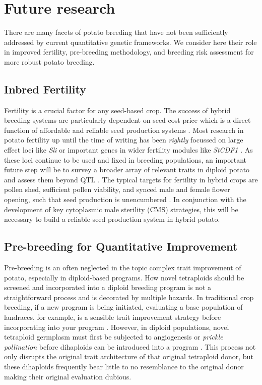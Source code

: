 \documentclass[
]{article}
\begin{document}
\section{Future research}\label{sec-future}

There are many facets of potato breeding that have not been sufficiently
addressed by current quantitative genetic frameworks. We consider here
their role in improved fertility, pre-breeding methodology, and breeding
risk assessment for more robust potato breeding.

\subsection{Inbred Fertility}\label{inbred-fertility}

Fertility is a crucial factor for any seed-based crop. The success of
hybrid breeding systems are particularly dependent on seed cost price
which is a direct function of affordable and reliable seed production
systems \autocite{Mao1998,Longin2014}. Most research in potato fertility
up until the time of writing has been \emph{rightly} focussed on large
effect loci like \emph{Sli} or important genes in wider fertility
modules like \emph{StCDF1} \autocite{Clot2020,Eggers2021,Song2022}. As
these loci continue to be used and fixed in breeding populations, an
important future step will be to survey a broader array of relevant
traits in diploid potato and assess them beyond QTL
\autocite{Kempe2011}. The typical targets for fertility in hybrid crops
are pollen shed, sufficient pollen viability, and synced male and female
flower opening, such that seed production is unencumbered
\autocite{Ortiz1997,Longin2012}. In conjunction with the development of
key cytoplasmic male sterility (CMS) strategies, this will be necessary
to build a reliable seed production system in hybrid potato.

\subsection{Pre-breeding for Quantitative
Improvement}\label{pre-breeding-for-quantitative-improvement}

Pre-breeding is an often neglected in the topic complex trait
improvement of potato, especially in diploid-based programs. How novel
tetraploids should be screened and incorporated into a diploid breeding
program is not a straightforward process and is decorated by multiple
hazards. In traditional crop breeding, if a new program is being
initiated, evaluating a base population of landraces, for example, is a
sensible trait improvement strategy before incorporating into your
program \autocite{Gorjanc2016}. However, in diploid populations, novel
tetraploid germplasm must first be subjected to angiogenesis or
\emph{prickle pollination} before dihaploids can be introduced into a
program \autocite{Uijtewaal1987,Tai2003}. This process not only disrupts
the original trait architecture of that original tetraploid donor, but
these dihaploids frequently bear little to no resemblance to the
original donor making their original evaluation dubious.
\end{document}
